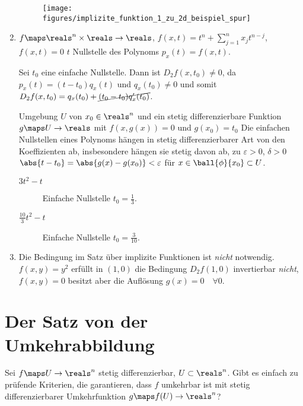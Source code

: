 \begin{beispiele*}
\begin{enumerate}
\begin{beispiel*}
\begin{equation*}
        \end{equation*}
        \begin{figure}[H]
          \centering
          \texttt{[image: figures/implizite\_funktion\_1\_zu\_2d\_beispiel\_spur]}
          \label{fig:implizite_funktion_1_zu_2d_beispiel_spur}
        \end{figure}
      \end{beispiel*}
      \item \( f\maps \reals^n\times \reals\to \reals \), \( f(x,t)=t^n+\sum_{j=1}^{n}x_j t^{n-j} \), \( f(x,t)=0 \) \timplies \( t \) Nullstelle des Polynoms \( p_x(t)=f(x,t) \).

      Sei \( t_0 \) eine einfache Nullstelle. Dann ist \( D_2f(x,t_0)\neq 0 \), da \( p_x(t)=(t-t_0)q_x(t) \) und \( q_x(t_0)\neq 0 \) und somit \( D_2f(x,t_0)=q_x(t_0)+\cancel{(t_0-t_0)q_x'(t_0)} \).

      \timplies \texists  Umgebung \( U \) von \( x_0\in \reals^n \) und ein stetig differenzierbare Funktion \( g\maps U\to \reals \) mit \( f(x,g(x))=0 \) und \( g(x_0)=t_0 \) \timplies Die einfachen Nullstellen eines Polynoms hängen in stetig differenzierbarer Art von den Koeffizienten ab, \dh insbesondere hängen sie stetig davon ab, \dh zu \( \varepsilon>0 \), \texists \( \delta>0 \) \sd \( \abs{t-t_0}=\abs{g(x)-g(x_0)}<\varepsilon \) für \( x\in \ball{\phi}{x_0}\subset U \). 
      \begin{beispiel*}
        \begin{description}
          \item[\( 3t^2-t \)] Einfache Nullstelle \( t_0=\frac{1}{3} \).
          \item[\( \frac{10}{3}t^2-t \)] Einfache Nullstelle \( t_0=\frac{3}{10} \). 
        \end{description}
      \end{beispiel*}
      \item Die Bedingung im Satz über implizite Funktionen ist \emph{nicht} notwendig. \( f(x,y)=y^2 \) erfüllt in \( (1,0) \) die Bedingung \( D_2 f(1,0) \) invertierbar \emph{nicht}, \( f(x,y)=0 \) besitzt aber die Auflösung \( g(x)=0\quad \forall 0 \).
  \end{enumerate}
\end{beispiele*}
\section{Der Satz von der Umkehrabbildung}
Sei \( f\maps U\to \reals^n \) stetig differenzierbar, \( U\subset \reals^n \). Gibt es einfach zu prüfende Kriterien, die garantieren, dass \( f \) umkehrbar ist mit stetig differenzierbarer Umkehrfunktion \( g\maps f(U)\to \reals^n \)?

